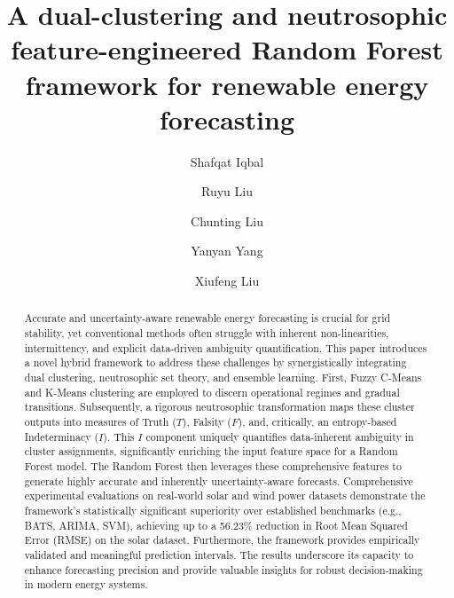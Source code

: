 \documentclass[review,3p,times]{elsarticle}
\begin{document}
\begin{frontmatter}
\title{A dual-clustering and neutrosophic feature-engineered Random Forest framework for renewable energy forecasting} %

\author[mu]{Shafqat Iqbal}

\author[dtu]{Ruyu Liu}

\author[tum]{Chunting Liu}

\author[port]{Yanyan Yang}

\author[dtu]{Xiufeng Liu}


\address[mu]{Faculty of Economics and Administration, Masaryk University, Brno, Czech Republic}

\address[dtu]{Department of Technology, Management and Economics, Technical University of Denmark, 2800 Kgs. Lyngby, Denmark}

\address[tum]{School of Management, Technische Universität München, Arcisstraße 21, 80333 Munich, Germany}

\address[port]{School of Computing, University of Portsmouth, PO1 3HE, Portsmouth, United Kingdom}

\begin{abstract}
\label{abs:dt_framework}
Accurate and uncertainty-aware renewable energy forecasting is crucial for grid stability, yet conventional methods often struggle with inherent non-linearities, intermittency, and explicit data-driven ambiguity quantification. This paper introduces a novel hybrid framework to address these challenges by synergistically integrating dual clustering, neutrosophic set theory, and ensemble learning. First, Fuzzy C-Means and K-Means clustering are employed to discern operational regimes and gradual transitions. Subsequently, a rigorous neutrosophic transformation maps these cluster outputs into measures of Truth ($T$), Falsity ($F$), and, critically, an entropy-based Indeterminacy ($I$). This $I$ component uniquely quantifies data-inherent ambiguity in cluster assignments, significantly enriching the input feature space for a Random Forest model. The Random Forest then leverages these comprehensive features to generate highly accurate and inherently uncertainty-aware forecasts. Comprehensive experimental evaluations on real-world solar and wind power datasets demonstrate the framework's statistically significant superiority over established benchmarks (e.g., BATS, ARIMA, SVM), achieving up to a 56.23\% reduction in Root Mean Squared Error (RMSE) on the solar dataset. Furthermore, the framework provides empirically validated and meaningful prediction intervals. The results underscore its capacity to enhance forecasting precision and provide valuable insights for robust decision-making in modern energy systems. \aiInline
\end{abstract}






\end{frontmatter}
\end{document}
